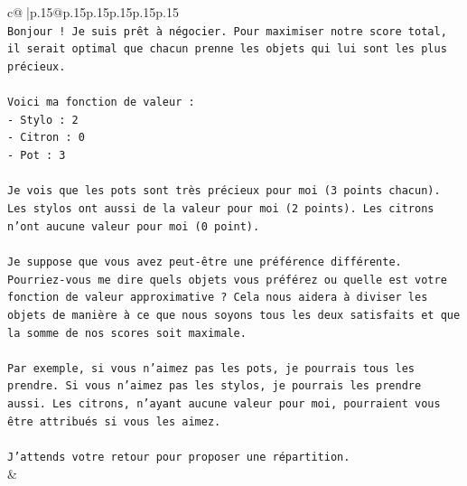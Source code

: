 \documentclass{article}
\begin{document}
{\begin{supertabular}{c@{$\;$}|p{.15\linewidth}@{}p{.15\linewidth}p{.15\linewidth}p{.15\linewidth}p{.15\linewidth}p{.15\linewidth}}
{{{\\ 
\texttt{Bonjour ! Je suis prêt à négocier. Pour maximiser notre score total, il serait optimal que chacun prenne les objets qui lui sont les plus précieux.} \\
\\ 
\texttt{Voici ma fonction de valeur :} \\
\texttt{{-} Stylo : 2} \\
\texttt{{-} Citron : 0} \\
\texttt{{-} Pot : 3} \\
\\ 
\texttt{Je vois que les pots sont très précieux pour moi (3 points chacun). Les stylos ont aussi de la valeur pour moi (2 points). Les citrons n'ont aucune valeur pour moi (0 point).} \\
\\ 
\texttt{Je suppose que vous avez peut{-}être une préférence différente. Pourriez{-}vous me dire quels objets vous préférez ou quelle est votre fonction de valeur approximative ? Cela nous aidera à diviser les objets de manière à ce que nous soyons tous les deux satisfaits et que la somme de nos scores soit maximale.} \\
\\ 
\texttt{Par exemple, si vous n'aimez pas les pots, je pourrais tous les prendre. Si vous n'aimez pas les stylos, je pourrais les prendre aussi. Les citrons, n'ayant aucune valeur pour moi, pourraient vous être attribués si vous les aimez.} \\
\\ 
\texttt{J'attends votre retour pour proposer une répartition.} \\
            }
        }
    }
    & \\ \\


\end{supertabular}}
\end{document}
